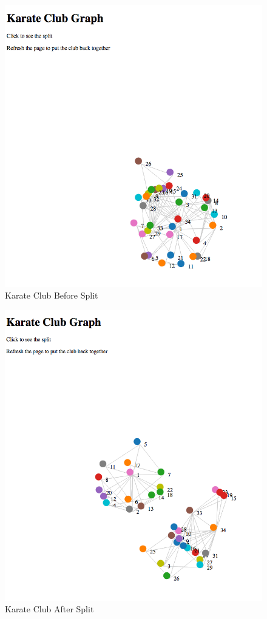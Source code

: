 \documentclass{article}
\begin{document}
\begin{figure}[H]
\centering
\includegraphics[scale=0.50]{q1/kcbeforesplit}
\caption{Karate Club Before Split}
\label{before}
\end{figure}

\begin{figure}[H]
\centering
\includegraphics[scale=0.50]{q1/kcaftersplit}
\caption{Karate Club After Split}
\label{after}
\end{figure}
\end{document}
